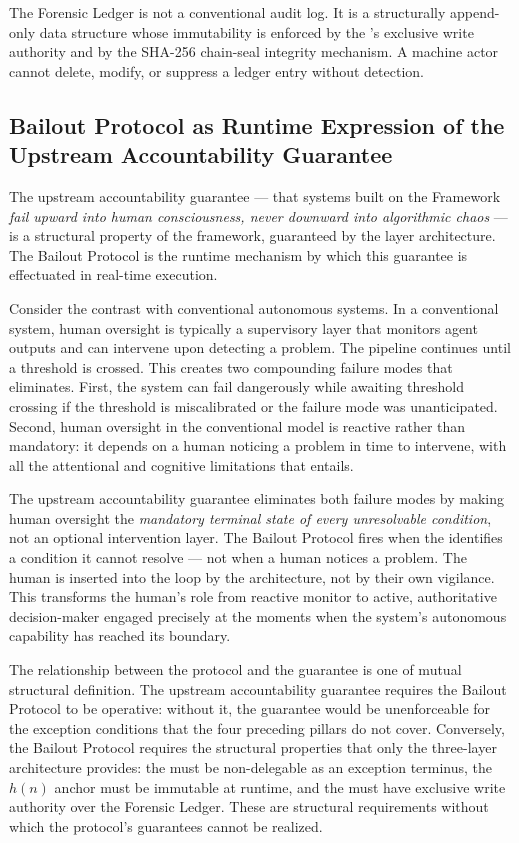 The Forensic Ledger is not a conventional audit log. It is a structurally append-only data structure whose immutability is enforced by the \fact's exclusive write authority and by the SHA-256 chain-seal integrity mechanism. A machine actor cannot delete, modify, or suppress a ledger entry without detection.

\subsection{Bailout Protocol as Runtime Expression of the Upstream Accountability Guarantee}
\label{sec:runtime-expression}

The upstream accountability guarantee — that systems built on the \bxthree{} Framework \textit{fail upward into human consciousness, never downward into algorithmic chaos} — is a structural property of the framework, guaranteed by the layer architecture. The Bailout Protocol is the runtime mechanism by which this guarantee is effectuated in real-time execution.

Consider the contrast with conventional autonomous systems. In a conventional system, human oversight is typically a supervisory layer that monitors agent outputs and can intervene upon detecting a problem. The pipeline continues until a threshold is crossed. This creates two compounding failure modes that \bxthree{} eliminates. First, the system can fail dangerously while awaiting threshold crossing if the threshold is miscalibrated or the failure mode was unanticipated. Second, human oversight in the conventional model is reactive rather than mandatory: it depends on a human noticing a problem in time to intervene, with all the attentional and cognitive limitations that entails.

The \bxthree{} upstream accountability guarantee eliminates both failure modes by making human oversight the \textit{mandatory terminal state of every unresolvable condition}, not an optional intervention layer. The Bailout Protocol fires when the \bounds{} identifies a condition it cannot resolve — not when a human notices a problem. The human is inserted into the loop by the architecture, not by their own vigilance. This transforms the human's role from reactive monitor to active, authoritative decision-maker engaged precisely at the moments when the system's autonomous capability has reached its boundary.

The relationship between the protocol and the guarantee is one of mutual structural definition. The upstream accountability guarantee requires the Bailout Protocol to be operative: without it, the guarantee would be unenforceable for the exception conditions that the four preceding pillars do not cover. Conversely, the Bailout Protocol requires the structural properties that only the \bxthree{} three-layer architecture provides: the \purpose{} must be non-delegable as an exception terminus, the $h(n)$ anchor must be immutable at runtime, and the \fact{} must have exclusive write authority over the Forensic Ledger. These are structural requirements without which the protocol's guarantees cannot be realized.

